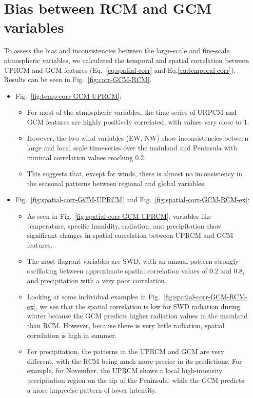 \documentclass[a4paper,11pt,oneside]{report}
\begin{document}
\section{Bias between RCM and GCM variables}\label{sec:res-bias-RCM-GCM}
To assess the bias and inconsistencies between the large-scale and fine-scale atmospheric variables, we calculated the temporal and spatial correlation between UPRCM and GCM features (Eq.~\ref{eq:spatial-corr} and Eq.\ref{eq:temporal-corr}). Results can be seen in Fig.~\ref{fig:corr-GCM-RCM}. 
\begin{itemize}
    \item Fig.~\ref{fig:temp-corr-GCM-UPRCM}: 
    \begin{itemize}
        \item For most of the atmospheric variables, the time-series of URPCM and GCM features are highly positively correlated, with values very close to $1$. 
        \item However, the two wind variables (EW, NW) show inconsistencies between large and local scale time-series over the mainland and Peninsula with minimal correlation values reaching $0.2$.
        \item This suggests that, except for winds, there is almost no inconsistency in the seasonal patterns between regional and global variables. 
    \end{itemize}
    \item Fig.~\ref{fig:spatial-corr-GCM-UPRCM} and Fig.~\ref{fig:spatial-corr-GCM-RCM-ex}: 
    \begin{itemize}
        \item As seen in Fig.~\ref{fig:spatial-corr-GCM-UPRCM}, variables like temperature, specific humidity, radiation, and precipitation show significant changes in spatial correlation between UPRCM and GCM features.
        \item The most flagrant variables are SWD, with an annual pattern strongly oscillating between approximate spatial correlation values of $0.2$ and $0.8$, and precipitation with a very poor correlation.
        \item Looking at some individual examples in Fig.~\ref{fig:spatial-corr-GCM-RCM-ex}, we see that the spatial correlation is low for SWD radiation during winter because the GCM predicts higher radiation values in the mainland than RCM. However, because there is very little radiation, spatial correlation is high in summer. 
        \item For precipitation, the patterns in the UPRCM and GCM are very different, with the RCM being much more precise in its predictions. For example, for November, the UPRCM shows a local high-intensity precipitation region on the tip of the Peninsula, while the GCM predicts a more imprecise pattern of lower intensity. 

\end{itemize}
\end{itemize}
\end{document}
